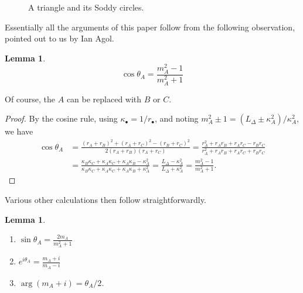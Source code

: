 \documentclass[12pt]{amsart}
\numberwithin{equation}{section}
\newtheorem{lem}[equation]{Lemma}
\theoremstyle{named}
\begin{document}
\begin{figure}
 \centering
{}
 \caption{A triangle and its Soddy circles.}
 \label{Fig:SoddyCircleExample}
\end{figure}

Essentially all the arguments of this paper follow from the following observation, pointed out to us by Ian Agol.
\begin{lem}
\[
\cos \theta_A = \frac{m_A^2 - 1}{m_A^2 + 1}
\]
\end{lem}
Of course, the $A$ can be replaced with $B$ or $C$.

\begin{proof}
By the cosine rule, using $\kappa_\bullet = 1/r_\bullet$, and noting
$m_A^2 \pm 1 = (L_\Delta \pm \kappa_A^2)/\kappa_A^2$, we have
\begin{align*}
\cos \theta_A &= \frac{ (r_A + r_B)^2 + (r_{A}+r_C)^2 - (r_{B}+r_C)^2}{2(r_{A}+r_B)(r_A+r_C)} 
= \frac{ r_A^2 + r_A r_B + r_A r_C - r_B r_C}{r_A^2 + r_A r_B + r_A r_C + r_B r_C} \\
&= \frac{ \kappa_{B} \kappa_C + \kappa_{A} \kappa_C + \kappa_A \kappa_B - \kappa_A^2}{\kappa_{B} \kappa_C + \kappa_{A} \kappa_C + \kappa_A \kappa_B + \kappa_A^2} 
= \frac{L_\Delta - \kappa_A^2}{L_\Delta + \kappa_A^2}
= \frac{m_A^2-1}{m_A^2+1}.
\end{align*}
\end{proof}

Various other calculations then follow straightforwardly.
\begin{lem} \
\label{Lem:exp_Agol}
\begin{enumerate}
\item 
$\sin \theta_A = \frac{2m_A}{m_A^2 + 1}$
\item 
$e^{i \theta_A} = \frac{m_A + i}{m_A - i}$
\item 
$\arg (m_A + i) = \theta_A/2$.
\end{enumerate}
\end{lem}
\end{document}
